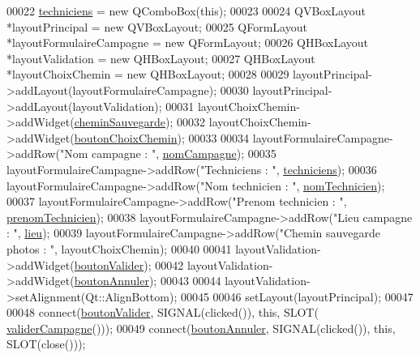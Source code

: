 \begin{DoxyCode}
00022     \hyperlink{class_i_h_m_creation_campagne_a8235e7a18cda1298be624a59a4cc1a56}{techniciens} = \textcolor{keyword}{new} QComboBox(\textcolor{keyword}{this});
00023 
00024     QVBoxLayout *layoutPrincipal = \textcolor{keyword}{new} QVBoxLayout;
00025     QFormLayout *layoutFormulaireCampagne = \textcolor{keyword}{new} QFormLayout;
00026     QHBoxLayout *layoutValidation = \textcolor{keyword}{new} QHBoxLayout;
00027     QHBoxLayout *layoutChoixChemin = \textcolor{keyword}{new} QHBoxLayout;
00028 
00029     layoutPrincipal->addLayout(layoutFormulaireCampagne);
00030     layoutPrincipal->addLayout(layoutValidation);
00031     layoutChoixChemin->addWidget(\hyperlink{class_i_h_m_creation_campagne_a95c12e2d42063f9c510704b87e3357da}{cheminSauvegarde});
00032     layoutChoixChemin->addWidget(\hyperlink{class_i_h_m_creation_campagne_ab709b06a83d8e1ebf9c920e7c60e2d79}{boutonChoixChemin});
00033 
00034     layoutFormulaireCampagne->addRow(\textcolor{stringliteral}{"Nom campagne : "}, \hyperlink{class_i_h_m_creation_campagne_a6f07f2571a10f035c7b6a3ef1daefdab}{nomCampagne});
00035     layoutFormulaireCampagne->addRow(\textcolor{stringliteral}{"Techniciens : "}, \hyperlink{class_i_h_m_creation_campagne_a8235e7a18cda1298be624a59a4cc1a56}{techniciens});
00036     layoutFormulaireCampagne->addRow(\textcolor{stringliteral}{"Nom technicien : "}, \hyperlink{class_i_h_m_creation_campagne_a5546fee9a51daceb1b719b105427dfe9}{nomTechnicien});
00037     layoutFormulaireCampagne->addRow(\textcolor{stringliteral}{"Prenom technicien : "}, \hyperlink{class_i_h_m_creation_campagne_a95e0a4f224110a79731e947baa505b7e}{prenomTechnicien});
00038     layoutFormulaireCampagne->addRow(\textcolor{stringliteral}{"Lieu campagne : "}, \hyperlink{class_i_h_m_creation_campagne_af68a722acc97a1011ff82752169a2ac8}{lieu});
00039     layoutFormulaireCampagne->addRow(\textcolor{stringliteral}{"Chemin sauvegarde photos : "}, layoutChoixChemin);
00040 
00041     layoutValidation->addWidget(\hyperlink{class_i_h_m_creation_campagne_a7c1dbc0141ba19b9ac16ea1444cd5d6f}{boutonValider});
00042     layoutValidation->addWidget(\hyperlink{class_i_h_m_creation_campagne_ab20ebd5f09b98103c682ed2e1b192a1d}{boutonAnnuler});
00043 
00044     layoutValidation->setAlignment(Qt::AlignBottom);
00045 
00046     setLayout(layoutPrincipal);
00047 
00048     connect(\hyperlink{class_i_h_m_creation_campagne_a7c1dbc0141ba19b9ac16ea1444cd5d6f}{boutonValider}, SIGNAL(clicked()), \textcolor{keyword}{this}, SLOT(
      \hyperlink{class_i_h_m_creation_campagne_ad5c63453b1b8d1099a43ff3522244072}{validerCampagne}()));
00049     connect(\hyperlink{class_i_h_m_creation_campagne_ab20ebd5f09b98103c682ed2e1b192a1d}{boutonAnnuler}, SIGNAL(clicked()), \textcolor{keyword}{this}, SLOT(close()));

\end{DoxyCode}
